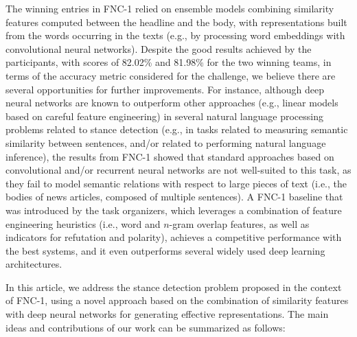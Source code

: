 The winning entries in FNC-1 relied on ensemble models combining similarity features computed between the headline and the body, with representations built from the words occurring in the texts (e.g., by processing word embeddings with convolutional neural networks). Despite the good results achieved by the participants, with scores of 82.02\% and 81.98\% for the two winning teams, in terms of the accuracy metric considered for the challenge, we believe there are several opportunities for further improvements. For instance, although deep neural networks are known to outperform other approaches (e.g., linear models based on careful feature engineering) in several natural language processing problems related to stance detection (e.g., in tasks related to measuring semantic similarity between sentences, and/or related to performing natural language inference), the results from FNC-1 showed that standard approaches based on convolutional and/or recurrent neural networks are not well-suited to this task, as they fail to model semantic relations with respect to large pieces of text (i.e., the bodies of news articles, composed of multiple sentences). A FNC-1 baseline that was introduced by the task organizers, which leverages a combination of feature engineering heuristics (i.e., word and $n$-gram overlap features, as well as indicators for refutation and polarity), achieves a competitive performance with the best systems, and it even outperforms several widely used deep learning architectures. 

In this article, we address the stance detection problem proposed in the context of FNC-1, using a novel approach based on the combination of similarity features with deep neural networks for generating effective representations. The main ideas and contributions of our work can be summarized as follows:

